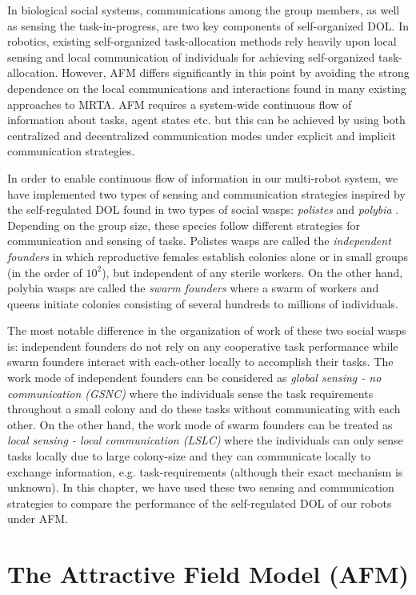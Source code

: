 \documentclass{intech}
\begin{document}
In biological social systems, communications among the group members, as well as sensing the task-in-progress, are two key components of self-organized DOL. In robotics, existing self-organized task-allocation methods rely heavily upon local sensing and local communication of individuals for achieving self-organized task-allocation. However, AFM differs significantly in this point by avoiding the strong dependence on the local communications and interactions found in many existing approaches to MRTA. AFM requires a system-wide continuous flow of information about tasks, agent states etc. but this can be achieved by using both centralized and decentralized communication modes under explicit and implicit communication strategies. 

In order to enable continuous flow of information in our multi-robot system, we have implemented two types of sensing and communication strategies inspired by the self-regulated DOL found in two types of social wasps: {\em polistes} and {\em polybia} \citep{Jeanne1999}. Depending on the group size, these species follow different strategies for communication and sensing of tasks. Polistes wasps are called the {\em independent founders} in which reproductive females establish colonies alone or in small groups (in the order of $10^2$), but independent of any sterile workers. On the other hand, polybia wasps are called the {\em swarm founders} where a swarm of workers and queens initiate colonies consisting of several hundreds to millions of individuals.

The most notable difference in the organization of work of these two social wasps is: independent founders do not rely on any cooperative task performance while swarm founders interact with each-other locally to accomplish their tasks. The work mode of independent founders can be considered as {\em global sensing - no communication (GSNC)} where the individuals sense the task requirements throughout a small colony and do these tasks without communicating with each other. On the other hand, the work mode of swarm founders can be treated as {\em local sensing - local communication (LSLC)} where the individuals can only sense tasks locally due to large colony-size and they can communicate locally to exchange information, e.g. task-requirements (although their exact mechanism is unknown). In this chapter, we have used these two sensing and communication strategies to compare the performance of the self-regulated DOL of our robots under AFM.
%
\section{The Attractive Field Model (AFM)}
\label{afm}
\end{document}
